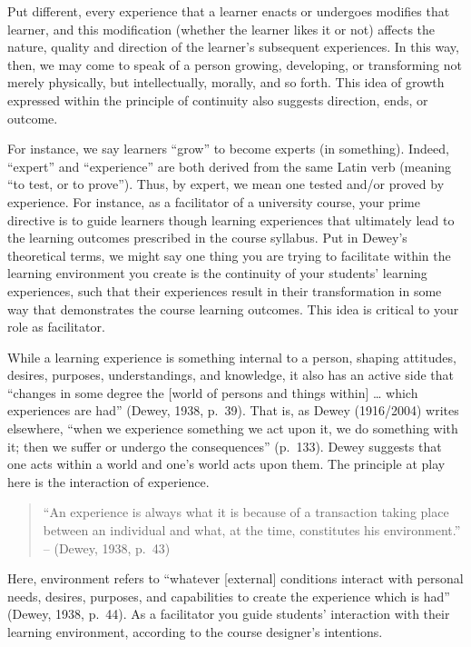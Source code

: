 \documentclass[
]{book}
\begin{document}
Put different, every experience that a learner enacts or undergoes modifies that learner, and this modification (whether the learner likes it or not) affects the nature, quality and direction of the learner's subsequent experiences. In this way, then, we may come to speak of a person growing, developing, or transforming not merely physically, but intellectually, morally, and so forth. This idea of growth expressed within the principle of continuity also suggests direction, ends, or outcome.

For instance, we say learners ``grow'' to become experts (in something). Indeed, ``expert'' and ``experience'' are both derived from the same Latin verb (meaning ``to test, or to prove''). Thus, by expert, we mean one tested and/or proved by experience. For instance, as a facilitator of a university course, your prime directive is to guide learners though learning experiences that ultimately lead to the learning outcomes prescribed in the course syllabus. Put in Dewey's theoretical terms, we might say one thing you are trying to facilitate within the learning environment you create is the continuity of your students' learning experiences, such that their experiences result in their transformation in some way that demonstrates the course learning outcomes. This idea is critical to your role as facilitator.

While a learning experience is something internal to a person, shaping attitudes, desires, purposes, understandings, and knowledge, it also has an active side that ``changes in some degree the {[}world of persons and things within{]} \ldots{} which experiences are had'' (Dewey, 1938, p.~39). That is, as Dewey (1916/2004) writes elsewhere, ``when we experience something we act upon it, we do something with it; then we suffer or undergo the consequences'' (p.~133). Dewey suggests that one acts within a world and one's world acts upon them. The principle at play here is the interaction of experience.

\begin{quote}
``An experience is always what it is because of a transaction taking place between an individual and what, at the time, constitutes his environment.'' -- (Dewey, 1938, p.~43)
\end{quote}

Here, environment refers to ``whatever {[}external{]} conditions interact with personal needs, desires, purposes, and capabilities to create the experience which is had'' (Dewey, 1938, p.~44). As a facilitator you guide students' interaction with their learning environment, according to the course designer's intentions.
\end{document}
